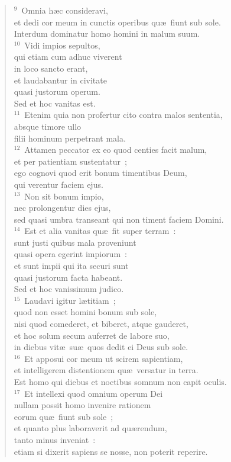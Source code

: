 \begin{flushleft}\begin{verse}${}^{9}$~Omnia h\ae c consideravi,\\ et dedi cor meum in cunctis operibus qu\ae\ fiunt sub sole.\\ Interdum dominatur homo homini in malum suum.\\
${}^{10}$~Vidi impios sepultos,\\ qui etiam cum adhuc viverent\\ in loco sancto erant,\\ et laudabantur in civitate\\ quasi justorum operum.\\ Sed et hoc vanitas est.\\
${}^{11}$~Etenim quia non profertur cito contra malos sententia,\\ absque timore ullo\\ filii hominum perpetrant mala.\\
${}^{12}$~Attamen peccator ex eo quod centies facit malum,\\ et per patientiam sustentatur~;\\ ego cognovi quod erit bonum timentibus Deum,\\ qui verentur faciem ejus.\\
${}^{13}$~Non sit bonum impio,\\ nec prolongentur dies ejus,\\ sed quasi umbra transeant qui non timent faciem Domini.\\
${}^{14}$~Est et alia vanitas qu\ae\ fit super terram~:\\ sunt justi quibus mala proveniunt\\ quasi opera egerint impiorum~:\\ et sunt impii qui ita securi sunt\\ quasi justorum facta habeant.\\ Sed et hoc vanissimum judico.\\
${}^{15}$~Laudavi igitur l\ae titiam~;\\ quod non esset homini bonum sub sole,\\ nisi quod comederet, et biberet, atque gauderet,\\ et hoc solum secum auferret de labore suo,\\ in diebus vit\ae\ su\ae\ quos dedit ei Deus sub sole.\\
${}^{16}$~Et apposui cor meum ut scirem sapientiam,\\ et intelligerem distentionem qu\ae\ versatur in terra.\\ Est homo qui diebus et noctibus somnum non capit oculis.\\
${}^{17}$~Et intellexi quod omnium operum Dei\\ nullam possit homo invenire rationem\\ eorum qu\ae\ fiunt sub sole~;\\ et quanto plus laboraverit ad qu\ae rendum,\\ tanto minus inveniat~:\\ etiam si dixerit sapiens se nosse, non poterit reperire.\end{verse}\end{flushleft}


